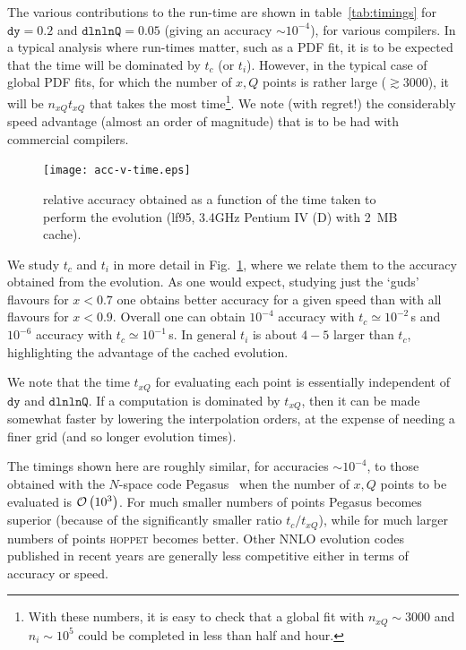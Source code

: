 \documentclass[12pt]{article}
\newcommand{\dy}{\ttt{dy}}
\newcommand{\dlnlnQ}{\ttt{dlnlnQ}}
\newcommand{\hoppet}{\textsc{hoppet}\xspace}
\newcommand{\ttt}[1]{\texttt{#1}}
\newcommand{\order}[1]{{\cal O}\left(#1\right)}
\begin{document}
The various contributions to the run-time are shown in
table~\ref{tab:timings} for $\dy=0.2$ and $\dlnlnQ=0.05$ (giving an
accuracy $\sim 10^{-4}$), for various compilers.  In a typical
analysis where run-times matter, such as a PDF fit, it is to be
expected that the time will be dominated by $t_c$ (or $t_i$). However,
in the typical case of global PDF fits, for which
the number of $x,Q$ points is rather large ($\gtrsim 3000$), 
 it will be $n_{xQ} t_{xQ}$ that takes the most time\footnote{
With these numbers, it is easy to check that a global fit with
$n_{xQ}\sim 3000$ and $n_i\sim 10^5$ could be completed
in less than half and hour.}. We note (with regret!) the
considerably speed advantage (almost an order
of magnitude) that is to be had with commercial
compilers.

\begin{figure}
  \centering
  \texttt{[image: acc-v-time.eps]}%
  \caption{relative accuracy obtained as a function of the time taken
    to perform the evolution (lf95, 3.4GHz Pentium IV (D) with 2~MB
    cache).}
  \label{fig:acc-v-time}
\end{figure}

We study $t_c$ and $t_i$ in more detail in Fig.~\ref{fig:acc-v-time},
where we relate them to the accuracy obtained from the evolution. As
one would expect, studying just the `guds' flavours for $x<0.7$ one
obtains better accuracy for a given speed than with all flavours for
$x<0.9$. Overall one can obtain $10^{-4}$ accuracy with $t_c \simeq
10^{-2}$\,s and $10^{-6}$ accuracy with $t_c \simeq 10^{-1}$\,s. In
general $t_i$ is about $4-5$ larger than $t_c$, highlighting the
advantage of the cached evolution. 

We note that the time $t_{xQ}$ for evaluating each point is
essentially independent of $\dy$ and $\dlnlnQ$. If a computation is
dominated by $t_{xQ}$, then it can be made somewhat faster by
lowering the interpolation orders, at the expense of needing a finer
grid (and so longer evolution times).

The timings shown here are roughly similar, for accuracies $\sim
10^{-4}$, to those obtained with the $N$-space code
Pegasus~\cite{Pegasus} when the number of $x,Q$ points to be
evaluated is $\order{10^3}$. For much smaller numbers of points
Pegasus becomes superior (because of the significantly smaller ratio
$t_c/t_{xQ}$), while for much larger numbers of points \hoppet becomes
better. Other NNLO evolution codes published in recent years 
\cite{Weinzierl:2002mv,coriano,Botje}
 are generally less competitive
either in terms of accuracy or speed.
\end{document}
